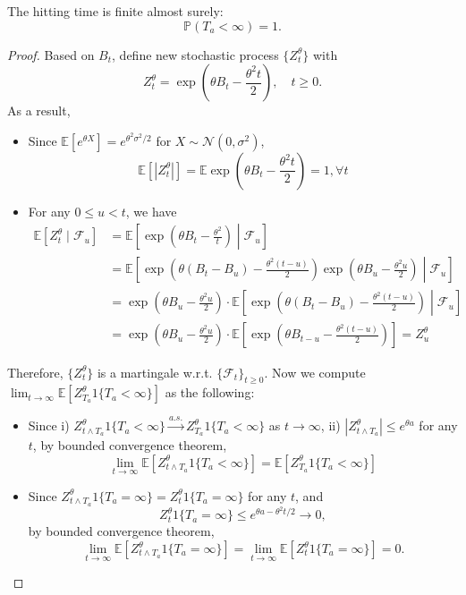 \begin{theorem}
The hitting time is finite almost surely:
\[
\mathbb{P}(T_a<\infty)=1.
\]
\end{theorem}
\begin{proof}
Based on $B_t$, define new stochastic process $\{Z_t^\theta\}$ with
\[
Z_t^\theta = \exp\left(
\theta B_t - \frac{\theta^2t}{2}
\right),\quad t\ge0.
\]
As a result,
\begin{itemize}
\item
Since $\mathbb{E}[e^{\theta X}] = e^{\theta^2\sigma^2/2}$ for $X\sim \mathcal{N}(0,\sigma^2)$,
\[
\mathbb{E}[|Z_t^\theta|] = \mathbb{E}\exp\left(
\theta B_t - \frac{\theta^2t}{2}
\right)=1,\forall t
\]
\item
For any $0\le u<t$, we have
\begin{align*}
\mathbb{E}[Z_t^\theta\mid\mathcal{F}_u]
&=
\mathbb{E}\left[
\exp\left(
\theta B_t - \frac{\theta^2}{t}
\right)
\middle|\mathcal{F}_u
\right]\\
&=
\mathbb{E}\left[
\exp\left(
\theta (B_t-B_u) - \frac{\theta^2(t-u)}{2}
\right)
\exp\left(
\theta B_u - \frac{\theta^2u}{2}
\right)
\middle|\mathcal{F}_u
\right]\\
&=
\exp\left(
\theta B_u - \frac{\theta^2u}{2}
\right)\cdot \mathbb{E}\left[
\exp\left(
\theta (B_t-B_u) - \frac{\theta^2(t-u)}{2}
\right)\middle|\mathcal{F}_u\right]\\
&=
\exp\left(
\theta B_u - \frac{\theta^2u}{2}
\right)\cdot \mathbb{E}\left[
\exp\left(
\theta B_{t-u} - \frac{\theta^2(t-u)}{2}
\right)\right]=Z_u^\theta
\end{align*}
\end{itemize}
Therefore, $\{Z_t^\theta\}$ is a martingale w.r.t. $\{\mathcal{F}_t\}_{t\ge0}$.
Now we compute $\lim_{t\to\infty}\mathbb{E}[
Z_{T_a}^\theta1\{T_a<\infty\}
]$ as the following:
\begin{itemize}
\item
Since i) $Z_{t\land T_a}^\theta1\{T_a<\infty\}\xrightarrow{a.s.} Z_{T_a}^\theta1\{T_a<\infty\}$ as $t\to\infty$,
ii) $|Z_{t\land T_a}^\theta|\le e^{\theta a}$ for any $t$,
by bounded convergence theorem,
\[
\lim_{t\to\infty}\mathbb{E}
[Z_{t\land T_a}^\theta1\{T_a<\infty\}]
=
\mathbb{E}
[
Z_{T_a}^\theta1\{T_a<\infty\}
]
\]
\item
Since $Z_{t\land T_a}^\theta1\{T_a=\infty\}=Z_{t}^\theta1\{T_a=\infty\}$ for any $t$, and
\[Z_{t}^\theta1\{T_a=\infty\}\le e^{\theta a-\theta^2t/2}\to0,\] by bounded convergence theorem,
\[
\lim_{t\to\infty}\mathbb{E}
[
Z_{t\land T_a}^\theta1\{T_a=\infty\}
]
=
\lim_{t\to\infty}\mathbb{E}
[
Z_{t}^\theta1\{T_a=\infty\}
]
=0.
\]



\end{itemize}
\end{proof}
